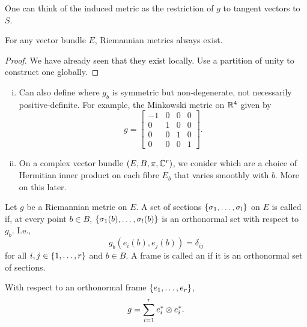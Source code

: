 \documentclass[main.tex]{subfiles}
\begin{document}
\begin{note}
  One can think of the induced metric as the restriction of $g$ to tangent vectors to $S$.
\end{note}

\begin{prop}
  For any vector bundle $E$, Riemannian metrics always exist.
\end{prop}

\begin{proof}
  We have already seen that they exist locally. Use a partition of unity to construct one globally.
\end{proof}

\begin{note}
  \begin{enumerate}[i.]
    \item Can also define  where $g_b$ is symmetric but non-degenerate, not necessarily positive-definite. For example, the Minkowski metric on $\mathbb{R}^4$ given by
    \[
    g = \begin{bmatrix} -1 & 0 & 0 & 0 \\
    0 & 1 & 0 & 0 \\
    0 & 0 & 1 & 0\\
    0 & 0 & 0 & 1 \end{bmatrix}.
    \]

    \item On a complex vector bundle $(E, B, \pi, \mathbb{C}^r)$, we conider  which are a choice of Hermitian inner product on each fibre $E_b$ that varies smoothly with $b$. More on this later.
  \end{enumerate}
\end{note}


  \begin{defn}
    Let $g$ be a Riemannian metric on $E$. A set of sections $\left\{\sigma_1, \dots, \sigma_l\right\}$ on $E$ is called  if, at every point $b \in B$, $\left\{\sigma_1(b), \dots, \sigma_l(b)\right\}$ is an orthonormal set with respect to $g_b$. I.e.,
    \[
    g_{b}(e_i(b), e_j(b)) = \delta_{ij}
    \] for all $i,j \in \left\{1,\dots, r\right\}$ and $b \in B$. A frame is called an  if it is an orthonormal set of sections.
  \end{defn}

  \begin{note}
    With respect to an orthonormal frame $\left\{e_1,\dots, e_r\right\}$,
    \[
    g = \sum_{i=1}^r e_i^* \otimes e_i^*.
    \]
  \end{note}
\end{document}

